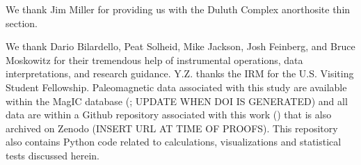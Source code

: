 \documentclass[draft]{agujournal2019}
\begin{document}
We thank Jim Miller for providing us with the Duluth Complex anorthosite thin section. 

We thank Dario Bilardello, Peat Solheid, Mike Jackson, Josh Feinberg, and Bruce Moskowitz for their tremendous help of instrumental operations, data interpretations, and research guidance. Y.Z. thanks the IRM for the U.S. Visiting Student Fellowship. Paleomagnetic data associated with this study are available within the MagIC database (\url{}; UPDATE WHEN DOI IS GENERATED) and all data are within a Github repository associated with this work (\url{}) that is also archived on Zenodo (INSERT URL AT TIME OF PROOFS). This repository also contains Python code related to calculations, visualizations and statistical tests discussed herein.  


\end{document}

